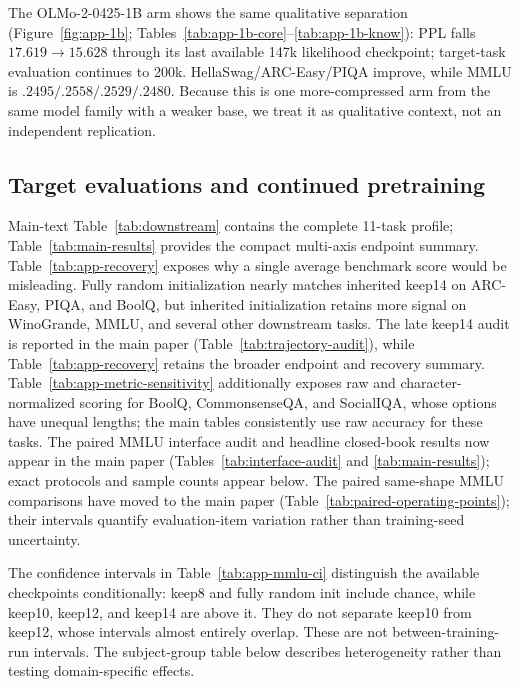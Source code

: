 The OLMo-2-0425-1B arm shows the same qualitative separation
(Figure~\ref{fig:app-1b}; Tables~\ref{tab:app-1b-core}--\ref{tab:app-1b-know}):
PPL falls $17.619\to15.628$ through its last available 147k likelihood
checkpoint; target-task evaluation continues to 200k. HellaSwag/ARC-Easy/PIQA
improve, while MMLU is
$.2495/.2558/.2529/.2480$. Because this is one more-compressed arm from the same
model family with a weaker base, we treat it as qualitative context, not an
independent replication.



\subsection{Target evaluations and continued pretraining}
\label{app:recovery}




Main-text Table~\ref{tab:downstream} contains the complete 11-task profile;
Table~\ref{tab:main-results} provides the compact multi-axis endpoint summary.
Table~\ref{tab:app-recovery} exposes why a single average benchmark score would
be misleading. Fully random initialization nearly matches inherited keep14 on
ARC-Easy, PIQA, and BoolQ, but inherited initialization retains more signal on
WinoGrande, MMLU, and several other downstream tasks. The late keep14 audit is
reported in the main paper (Table~\ref{tab:trajectory-audit}), while
Table~\ref{tab:app-recovery} retains the broader endpoint and recovery summary.
Table~\ref{tab:app-metric-sensitivity} additionally exposes raw and
character-normalized scoring for BoolQ, CommonsenseQA, and SocialIQA,
whose options have unequal lengths; the main tables consistently use raw
accuracy for these tasks. The paired MMLU interface audit and headline
closed-book results now appear in the main paper
(Tables~\ref{tab:interface-audit} and \ref{tab:main-results}); exact protocols
and sample counts appear below.
The paired same-shape MMLU comparisons have moved to the main paper
(Table~\ref{tab:paired-operating-points}); their intervals quantify
evaluation-item variation rather than training-seed uncertainty.

The confidence intervals in Table~\ref{tab:app-mmlu-ci} distinguish the
available checkpoints conditionally: keep8 and fully random init include
chance, while keep10, keep12, and keep14 are above it. They do not separate
keep10 from keep12, whose intervals almost entirely overlap. These are not
between-training-run intervals. The subject-group table below describes
heterogeneity rather than testing domain-specific effects.

